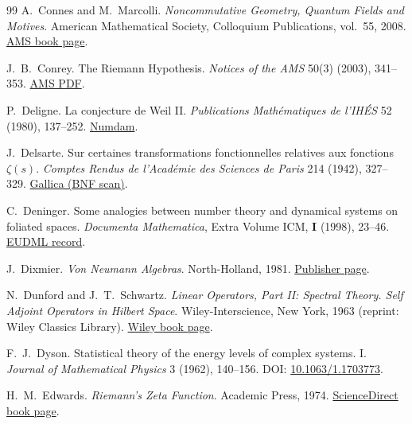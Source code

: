 \documentclass{article}
\numberwithin{equation}{section}
\theoremstyle{plain}
\theoremstyle{definition}
\theoremstyle{remark}
\begin{document}
\begin{thebibliography}{99}
A.~Connes and M.~Marcolli.
\newblock \emph{Noncommutative Geometry, Quantum Fields and Motives}.
\newblock American Mathematical Society, Colloquium Publications, vol.~55, 2008.
\newblock \href{https://bookstore.ams.org/coll-55/}{AMS book page}.

J.~B.~Conrey.
\newblock The Riemann Hypothesis.
\newblock \emph{Notices of the AMS} 50(3) (2003), 341--353.
\newblock \href{https://www.ams.org/notices/200303/fea-conrey-web.pdf}{AMS PDF}.

P.~Deligne.
\newblock La conjecture de Weil II.
\newblock \emph{Publications Math\'ematiques de l'IH\'ES} 52 (1980), 137--252.
\newblock \href{https://www.numdam.org/item/PMIHES_1980__52__137_0/}{Numdam}.

J.~Delsarte.
\newblock Sur certaines transformations fonctionnelles relatives aux
fonctions $\zeta(s)$.
\newblock \emph{Comptes Rendus de l'Acad\'emie des Sciences de Paris}
214 (1942), 327--329.
\newblock \href{https://gallica.bnf.fr/ark:/12148/bpt6k3186p/f327.item}{Gallica (BNF scan)}.


C.~Deninger.
\newblock Some analogies between number theory and dynamical systems on foliated spaces.
\newblock \emph{Documenta Mathematica}, Extra Volume ICM, \textbf{I} (1998), 23--46.
\newblock \href{https://eudml.org/doc/229449}{EUDML record}.


J.~Dixmier.
\newblock \emph{Von Neumann Algebras}.
\newblock North-Holland, 1981.
\newblock \href{https://www.elsevier.com/books/von-neumann-algebras/dixmier/978-0-444-86308-7}{Publisher page}.

N.~Dunford and J.~T.~Schwartz.
\newblock \emph{Linear Operators, Part II: Spectral Theory. Self Adjoint Operators in Hilbert Space}.
\newblock Wiley-Interscience, New York, 1963 (reprint: Wiley Classics Library).
\newblock \href{https://www.wiley.com/en-br/Linear%2BOperators%2C%2BPart%2B2%3A%2BSpectral%2BTheory%2C%2BSelf%2BAdjoint%2BOperators%2Bin%2BHilbert%2BSpace-p-9780471608479}{Wiley book page}.


F.~J.~Dyson.
\newblock Statistical theory of the energy levels of complex systems. I.
\newblock \emph{Journal of Mathematical Physics} 3 (1962), 140--156.
\newblock DOI:
\href{https://doi.org/10.1063/1.1703773}{10.1063/1.1703773}.

H.~M.~Edwards.
\newblock \emph{Riemann's Zeta Function}.
\newblock Academic Press, 1974.
\newblock \href{https://www.sciencedirect.com/book/9780122327506/riemanns-zeta-function}{ScienceDirect book page}.


\end{thebibliography}
\end{document}
